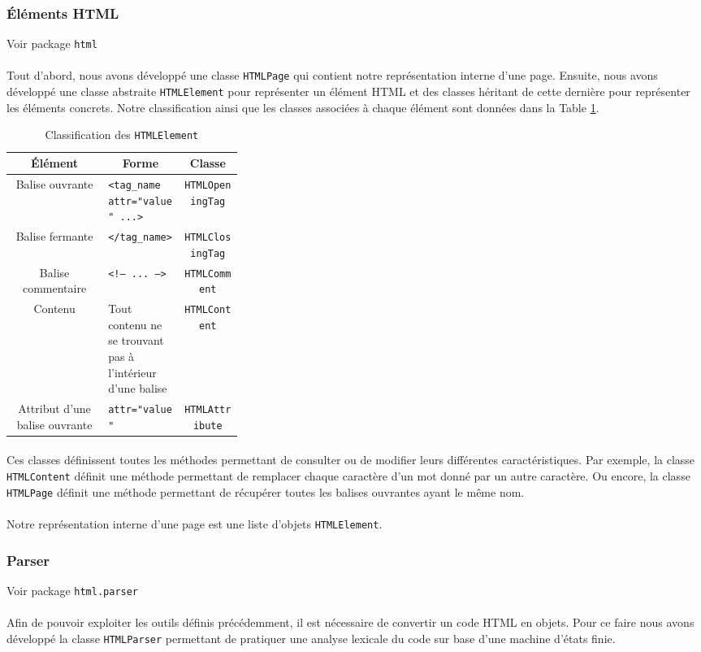 \documentclass[a4paper,11pt]{article}
\newcommand{\ttseek}[1]{Voir package \texttt{#1}\paragraph{}}
\begin{document}
\subsubsection{Éléments HTML}
\ttseek{html}
Tout d'abord, nous avons développé une classe \texttt{HTMLPage} qui contient notre représentation interne d'une page.
Ensuite, nous avons développé une classe abstraite \texttt{HTMLElement} pour représenter un élément HTML et des classes héritant de cette dernière pour représenter les éléments concrets. Notre classification ainsi que les classes associées à chaque élément sont données dans la Table \ref{tab:htmlelement}.
\begin{table}[h]
	\center
	\begin{tabular}{|c|p{0.33\linewidth}|c|}
		\hline
		\textbf{Élément} & \multicolumn{1}{c|}{\textbf{Forme}} & \textbf{Classe}\\
		\hline
		Balise ouvrante & \texttt{<tag\_name attr="value" ...>} & \texttt{HTMLOpeningTag}\\
		\hline
		Balise fermante & \texttt{</tag\_name>} & \texttt{HTMLClosingTag}\\
		\hline
		Balise commentaire & \texttt{<!-- ... -->} & \texttt{HTMLComment} \\
		\hline
		Contenu & Tout contenu ne se trouvant pas à l'intérieur d'une balise & \texttt{HTMLContent}\\
		\hline
		Attribut d'une balise ouvrante & \texttt{attr="value"} & \texttt{HTMLAttribute}\\
		\hline
	\end{tabular}
	\caption{Classification des \texttt{HTMLElement}}
	\label{tab:htmlelement}
\end{table}
\paragraph{} Ces classes définissent toutes les méthodes permettant de consulter ou de modifier leurs différentes caractéristiques. Par exemple, la classe \texttt{HTMLContent} définit une méthode permettant de remplacer chaque caractère d'un mot donné par un autre caractère. Ou encore, la classe \texttt{HTMLPage} définit une méthode permettant de récupérer toutes les balises ouvrantes ayant le même nom.
\paragraph{}
Notre représentation interne d'une page est une liste d'objets \texttt{HTMLElement}.
\subsubsection{Parser}
\ttseek{html.parser}
Afin de pouvoir exploiter les outils définis précédemment, il est nécessaire de convertir un code HTML en objets. Pour ce faire nous avons développé la classe \texttt{HTMLParser} permettant de pratiquer une analyse lexicale du code sur base d'une machine d'états finie.
\end{document}

